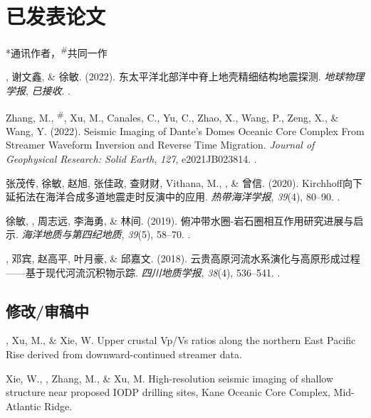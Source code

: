 \section{已发表论文}
\newcommand{\CS}{*} %
\newcommand{\CF}{\textsuperscript{\#}} %

\CS 通讯作者，\CF 共同一作
\begin{etaremune}
\item
    \狄, 谢文鑫, \& 徐敏. (2022).
    东太平洋北部洋中脊上地壳精细结构地震探测.
    \textit{地球物理学报}, \textit{已接收}.
    .
\item
    Zhang, M., \Di\CF, Xu, M., Canales, C., Yu, C., Zhao, X., Wang, P., Zeng, X., \& Wang, Y. (2022).
    Seismic Imaging of Dante's Domes Oceanic Core Complex From Streamer Waveform Inversion and Reverse Time Migration.
    \textit{Journal of Geophysical Research: Solid Earth}, \textit{127}, e2021JB023814.
    .
\item
    张茂传, 徐敏, 赵旭, 张佳政, 查财财, Vithana, M., \狄, \& 曾信. (2020).
    Kirchhoff向下延拓法在海洋合成多道地震走时反演中的应用.
    \textit{热带海洋学报}, \textit{39}(4), 80--90.
    .
\item
    徐敏, \狄, 周志远, 李海勇, \& 林间. (2019).
    俯冲带水圈-岩石圈相互作用研究进展与启示.
    \textit{海洋地质与第四纪地质}, \textit{39}(5), 58--70.
    .
\item
    \狄, 邓宾, 赵高平, 叶月豪, \& 邱嘉文. (2018).
    云贵高原河流水系演化与高原形成过程——基于现代河流沉积物示踪.
    \textit{四川地质学报}, \textit{38}(4), 536--541.
    .
\end{etaremune}

\subsection*{修改/审稿中}
\begin{etaremune}
\item
    \Di, Xu, M., \& Xie, W.
    Upper crustal Vp/Vs ratios along the northern East Pacific Rise derived from downward-continued streamer data.
\item
    Xie, W., \Di, Zhang, M., \&  Xu, M.
    High-resolution seismic imaging of shallow structure near proposed IODP drilling sites, Kane Oceanic Core Complex, Mid-Atlantic Ridge.
\end{etaremune}

